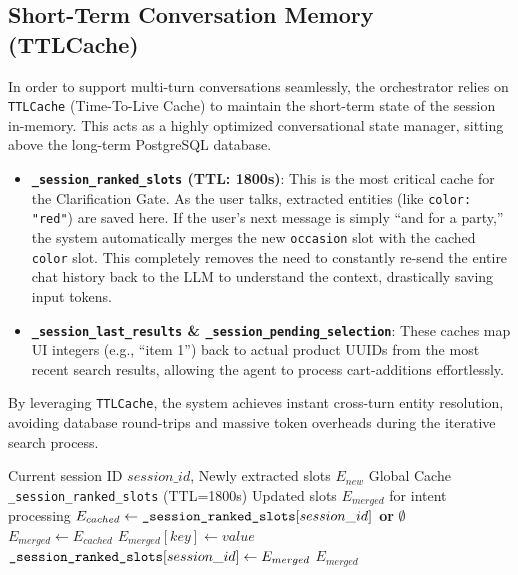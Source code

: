 \subsection{Short-Term Conversation Memory (TTLCache)}
In order to support multi-turn conversations seamlessly, the orchestrator relies on \texttt{TTLCache} (Time-To-Live Cache) to maintain the short-term state of the session in-memory. This acts as a highly optimized conversational state manager, sitting above the long-term PostgreSQL database.

\begin{itemize}
    \item \textbf{\texttt{\_session\_ranked\_slots} (TTL: 1800s)}: This is the most critical cache for the Clarification Gate. As the user talks, extracted entities (like \texttt{color: "red"}) are saved here. If the user's next message is simply ``and for a party,'' the system automatically merges the new \texttt{occasion} slot with the cached \texttt{color} slot. This completely removes the need to constantly re-send the entire chat history back to the LLM to understand the context, drastically saving input tokens.
    \item \textbf{\texttt{\_session\_last\_results} \& \texttt{\_session\_pending\_selection}}: These caches map UI integers (e.g., ``item 1'') back to actual product UUIDs from the most recent search results, allowing the agent to process cart-additions effortlessly.
\end{itemize}

By leveraging \texttt{TTLCache}, the system achieves instant cross-turn entity resolution, avoiding database round-trips and massive token overheads during the iterative search process.

\begin{algorithm}[H]
\caption{Short-Term Memory Management via TTLCache}\label{alg:ttlcache_memory}
\begin{algorithmic}[1]
\Require Current session ID $session\_id$, Newly extracted slots $E_{new}$
\Require Global Cache \texttt{\_session\_ranked\_slots} (TTL=1800s)
\Ensure Updated slots $E_{merged}$ for intent processing
    \State $E_{cached} \gets \text{\texttt{\_session\_ranked\_slots}}[session\_id]$ \textbf{or} $\emptyset$
    \State $E_{merged} \gets E_{cached}$
            \State $E_{merged}[key] \gets value$
        \EndIf
    \EndFor
    \State $\text{\texttt{\_session\_ranked\_slots}}[session\_id] \gets E_{merged}$
    \State \Return $E_{merged}$
\EndFunction
\end{algorithmic}
\end{algorithm}

